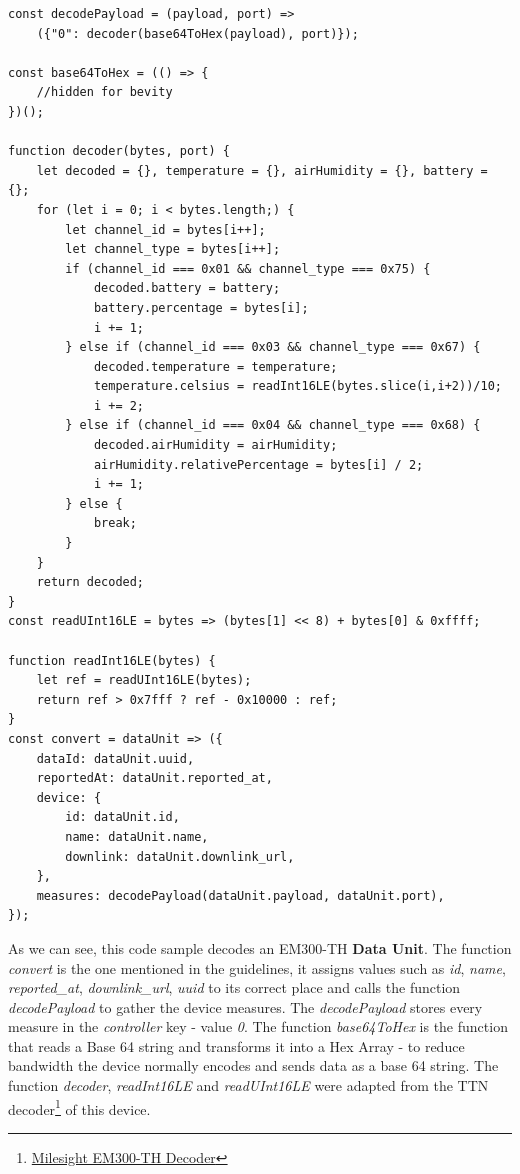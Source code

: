 \begin{lstlisting}[style=javascript, caption=EM300-TH Data Decoder Example, label={code:implementation:description:decoder:em300th}]
const decodePayload = (payload, port) =>
    ({"0": decoder(base64ToHex(payload), port)});

const base64ToHex = (() => {
    //hidden for bevity
})();

function decoder(bytes, port) {
    let decoded = {}, temperature = {}, airHumidity = {}, battery = {};
    for (let i = 0; i < bytes.length;) {
        let channel_id = bytes[i++];
        let channel_type = bytes[i++];
        if (channel_id === 0x01 && channel_type === 0x75) {
            decoded.battery = battery;
            battery.percentage = bytes[i];
            i += 1;
        } else if (channel_id === 0x03 && channel_type === 0x67) {
            decoded.temperature = temperature;
            temperature.celsius = readInt16LE(bytes.slice(i,i+2))/10;
            i += 2;
        } else if (channel_id === 0x04 && channel_type === 0x68) {
            decoded.airHumidity = airHumidity;
            airHumidity.relativePercentage = bytes[i] / 2;
            i += 1;
        } else {
            break;
        }
    }
    return decoded;
}
const readUInt16LE = bytes => (bytes[1] << 8) + bytes[0] & 0xffff;

function readInt16LE(bytes) {
    let ref = readUInt16LE(bytes);
    return ref > 0x7fff ? ref - 0x10000 : ref;
}
const convert = dataUnit => ({
    dataId: dataUnit.uuid,
    reportedAt: dataUnit.reported_at,
    device: {
        id: dataUnit.id,
        name: dataUnit.name,
        downlink: dataUnit.downlink_url,
    },
    measures: decodePayload(dataUnit.payload, dataUnit.port),
});
\end{lstlisting}

As we can see, this code sample decodes an EM300-TH \textbf{Data Unit}. The function \textit{convert} is the one mentioned in the guidelines, it assigns values such as \textit{id}, \textit{name}, \textit{reported\_at}, \textit{downlink\_url}, \textit{uuid} to its correct place and calls the function \textit{decodePayload} to gather the device measures. The \textit{decodePayload} stores every measure in the \textit{controller} key - value \textit{0}. The function \textit{base64ToHex} is the function that reads a Base 64 string and transforms it into a Hex Array - to reduce bandwidth the device normally encodes and sends data as a base 64 string. The function \textit{decoder}, \textit{readInt16LE} and \textit{readUInt16LE} were adapted from the TTN decoder\footnote{\href {https://www.milesight-iot.com/lorawan/sensor/em300-th}{Milesight EM300-TH Decoder}} of this device.


